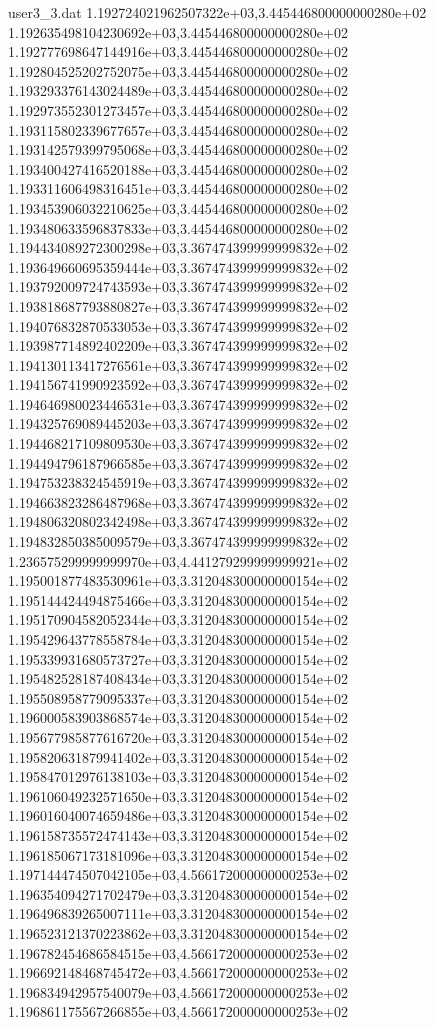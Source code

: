 \begin{filecontents}{user3_3.dat}
1.192724021962507322e+03,3.445446800000000280e+02
1.192635498104230692e+03,3.445446800000000280e+02
1.192777698647144916e+03,3.445446800000000280e+02
1.192804525202752075e+03,3.445446800000000280e+02
1.193293376143024489e+03,3.445446800000000280e+02
1.192973552301273457e+03,3.445446800000000280e+02
1.193115802339677657e+03,3.445446800000000280e+02
1.193142579399795068e+03,3.445446800000000280e+02
1.193400427416520188e+03,3.445446800000000280e+02
1.193311606498316451e+03,3.445446800000000280e+02
1.193453906032210625e+03,3.445446800000000280e+02
1.193480633596837833e+03,3.445446800000000280e+02
1.194434089272300298e+03,3.367474399999999832e+02
1.193649660695359444e+03,3.367474399999999832e+02
1.193792009724743593e+03,3.367474399999999832e+02
1.193818687793880827e+03,3.367474399999999832e+02
1.194076832870533053e+03,3.367474399999999832e+02
1.193987714892402209e+03,3.367474399999999832e+02
1.194130113417276561e+03,3.367474399999999832e+02
1.194156741990923592e+03,3.367474399999999832e+02
1.194646980023446531e+03,3.367474399999999832e+02
1.194325769089445203e+03,3.367474399999999832e+02
1.194468217109809530e+03,3.367474399999999832e+02
1.194494796187966585e+03,3.367474399999999832e+02
1.194753238324545919e+03,3.367474399999999832e+02
1.194663823286487968e+03,3.367474399999999832e+02
1.194806320802342498e+03,3.367474399999999832e+02
1.194832850385009579e+03,3.367474399999999832e+02
1.236575299999999970e+03,4.441279299999999921e+02
1.195001877483530961e+03,3.312048300000000154e+02
1.195144424494875466e+03,3.312048300000000154e+02
1.195170904582052344e+03,3.312048300000000154e+02
1.195429643778558784e+03,3.312048300000000154e+02
1.195339931680573727e+03,3.312048300000000154e+02
1.195482528187408434e+03,3.312048300000000154e+02
1.195508958779095337e+03,3.312048300000000154e+02
1.196000583903868574e+03,3.312048300000000154e+02
1.195677985877616720e+03,3.312048300000000154e+02
1.195820631879941402e+03,3.312048300000000154e+02
1.195847012976138103e+03,3.312048300000000154e+02
1.196106049232571650e+03,3.312048300000000154e+02
1.196016040074659486e+03,3.312048300000000154e+02
1.196158735572474143e+03,3.312048300000000154e+02
1.196185067173181096e+03,3.312048300000000154e+02
1.197144474507042105e+03,4.566172000000000253e+02
1.196354094271702479e+03,3.312048300000000154e+02
1.196496839265007111e+03,3.312048300000000154e+02
1.196523121370223862e+03,3.312048300000000154e+02
1.196782454686584515e+03,4.566172000000000253e+02
1.196692148468745472e+03,4.566172000000000253e+02
1.196834942957540079e+03,4.566172000000000253e+02
1.196861175567266855e+03,4.566172000000000253e+02

\end{filecontents}
